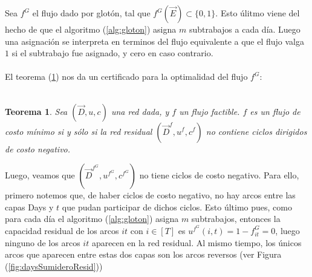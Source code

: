 \documentclass[10pt]{article}
\theoremstyle{plain}
\newtheorem{teo}{Teorema}
\theoremstyle{definition}
\begin{document}
Sea $f^G$ el flujo dado por glotón, tal que $f^G(\vec{E}) \subset \{0,1\}$. Esto úlitmo viene del hecho de que el algoritmo (\ref{alg:gloton}) asigna $m$ subtrabajos a cada día. Luego una asignación se interpreta en terminos del flujo equivalente a que el flujo valga $1$ si el subtrabajo fue asignado, y cero en caso contrario. \\~\\

El teorema (\ref{teo:certificado}) nos da un certificado para la optimalidad del flujo $f^G$:\\~\\
\begin{teo}
\label{teo:certificado}
Sea $(\vec{D}, u, c)$ una red dada, y $f$ un flujo factible. $f$ es un flujo de costo mínimo si y sólo si la red residual $(\vec{D}^f, u^f, c^f)$ no contiene ciclos dirigidos de costo negativo. 
\end{teo}

Luego, veamos que $(\vec{D}^{f^G}, u^{f^G}, c^{f^G})$ no tiene ciclos de costo negativo. Para ello, primero notemos que, de haber ciclos de costo negativo, no hay arcos entre las capas Days y $t$ que pudan participar de dichos ciclos. Esto último pues, como para cada día el algoritmo (\ref{alg:gloton}) asigna $m$ subtrabajos, entonces la capacidad residual de los arcos $it$ con $i \in [T]$ es $u^{f^G}(i,t) = 1-f^G_{it} = 0$, luego ninguno de los arcos $it$ aparecen en la red residual. Al mismo tiempo, los únicos arcos que aparecen entre estas dos capas son los arcos reversos (ver Figura (\ref{fig:daysSumideroResid}))
\end{document}
